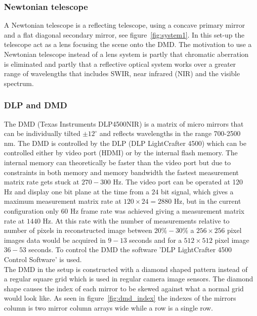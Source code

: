 \subsubsection{Newtonian telescope}
A Newtonian telescope is a reflecting telescope, using a concave primary mirror and a flat diagonal secondary mirror, see figure~\ref{fig:system1}. In this set-up the telescope act as a lens focusing the scene onto the DMD. The motivation to use a Newtonian telescope instead of a lens system is partly that chromatic aberration is eliminated and partly that a reflective optical system works over a greater range of wavelengths that includes SWIR, near infrared (NIR) and the visible spectrum.

\subsubsection{DLP and DMD}
The DMD (Texas Instruments DLP4500NIR) is a matrix of micro mirrors that can be individually tilted $\pm 12^{\circ}$ and reflects wavelengths in the range 700-2500 nm. The DMD is controlled by the DLP (DLP LightCrafter 4500) which can be controlled either by video port (HDMI) or by the internal flash memory. The internal memory can theoretically be faster than the video port but due to constraints in both memory and memory bandwidth the fastest measurement matrix rate gets stuck at $270 - 300$ Hz. The video port can be operated at 120 Hz and display one bit plane at the time from a $24$ bit signal, which gives a maximum measurement matrix rate at $120 \times 24 = 2880$ Hz, but in the current configuration only $60$ Hz frame rate was achieved giving a measurement matrix rate at $1440$ Hz. At this rate with the number of measurements relative to number of pixels in reconstructed image between $20\% - 30\%$ a $256\times256$ pixel images data would be acquired in $9 - 13$ seconds and for a $512\times512$ pixel image $36-53$ seconds. To control the DMD the software 'DLP LightCrafter 4500 Control Software' is used.\\[0.1in] 

The DMD in the setup is constructed with a diamond shaped pattern instead of a regular square grid which is used in regular camera image sensors. The diamond shape causes the index of each mirror to be skewed against what a normal grid would look like. As seen in figure~\ref{fig:dmd_index} the indexes of the mirrors column is two mirror column arrays wide while a row is a single row. 


